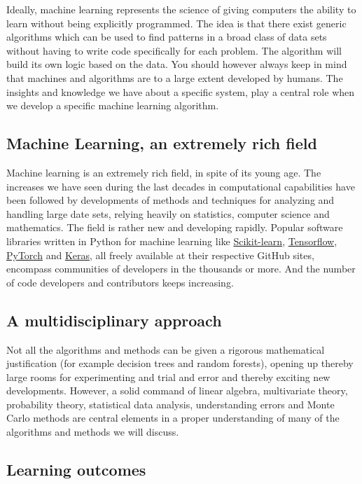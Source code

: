 \documentclass[%
oneside,                 %
final,                   %
10pt]{article}
\begin{document}
Ideally, machine learning represents the science of giving computers
the ability to learn without being explicitly programmed.  The idea is
that there exist generic algorithms which can be used to find patterns
in a broad class of data sets without having to write code
specifically for each problem. The algorithm will build its own logic
based on the data.  You should however always keep in mind that
machines and algorithms are to a large extent developed by humans. The
insights and knowledge we have about a specific system, play a central
role when we develop a specific machine learning algorithm. 

\subsection{Machine Learning, an extremely rich field}

Machine learning is an extremely rich field, in spite of its young
age. The increases we have seen during the last  decades in
computational capabilities have been followed by developments of
methods and techniques for analyzing and handling large date sets,
relying heavily on statistics, computer science and mathematics.  The
field is rather new and developing rapidly. Popular software libraries
written in Python for machine learning like
\href{{http://scikit-learn.org/stable/}}{Scikit-learn},
\href{{https://www.tensorflow.org/}}{Tensorflow},
\href{{http://pytorch.org/}}{PyTorch} and \href{{https://keras.io/}}{Keras}, all
freely available at their respective GitHub sites, encompass
communities of developers in the thousands or more. And the number of
code developers and contributors keeps increasing.

\subsection{A multidisciplinary approach}

Not all the
algorithms and methods can be given a rigorous mathematical
justification (for example decision trees and random forests), opening up thereby large rooms for experimenting and
trial and error and thereby exciting new developments.  However, a
solid command of linear algebra, multivariate theory, probability
theory, statistical data analysis, understanding errors and Monte
Carlo methods are central elements in a proper understanding of many
of the algorithms and methods we will discuss.


\subsection{Learning outcomes}
\end{document}
